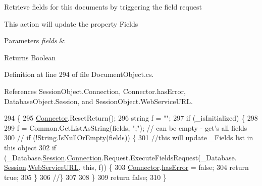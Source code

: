 Retrieve fields for this documents by triggering the field request 

This action will update the property \textquotesingle{}Fields\textquotesingle{}


\begin{DoxyParams}{Parameters}
{\em fields} & \\
\hline
\end{DoxyParams}
\begin{DoxyReturn}{Returns}
Boolean
\end{DoxyReturn}


Definition at line 294 of file Document\+Object.\+cs.



References Session\+Object.\+Connection, Connector.\+has\+Error, Database\+Object.\+Session, and Session\+Object.\+Web\+Service\+U\+RL.


\begin{DoxyCode}
294                                         \{
295         \hyperlink{class_connector}{Connector}.ResetReturn();
296         \textcolor{keywordtype}{string} f = \textcolor{stringliteral}{""};
297         \textcolor{keywordflow}{if} (\_isInitialized) \{
298 
299             f = Common.GetListAsString(fields, \textcolor{stringliteral}{";"}); \textcolor{comment}{// can be empty - get's all fields}
300             \textcolor{comment}{// if (!String.IsNullOrEmpty(fields)) \{}
301             \textcolor{comment}{//this will update \_Fields list in this object}
302             \textcolor{keywordflow}{if} (\_Database.\hyperlink{class_database_object_aa8484162b7d2a7c4c9426bca13c64c07}{Session}.\hyperlink{class_session_object_a014bdbf705a753540e19bfb53030c55c}{Connection}.Request.ExecuteFieldsRequest(\_Database.
      \hyperlink{class_database_object_aa8484162b7d2a7c4c9426bca13c64c07}{Session}.\hyperlink{class_session_object_a697c071c812fbf7ad1166b896fb44c16}{WebServiceURL}, \textcolor{keyword}{this}, f)) \{
303                 \hyperlink{class_connector}{Connector}.\hyperlink{class_connector_a079bae21a5417efa53bfe8954c0f533f}{hasError} = \textcolor{keyword}{false};
304                 \textcolor{keywordflow}{return} \textcolor{keyword}{true};
305             \}
306             \textcolor{comment}{//\}}
307 
308         \}
309         \textcolor{keywordflow}{return} \textcolor{keyword}{false};
310     \}
\end{DoxyCode}
\mbox{\label{class_document_object_af4298d6cfbb9ea60643d9995309b73f1}} 
